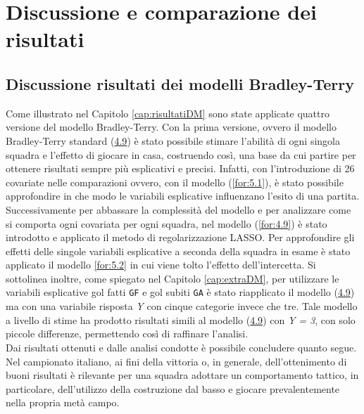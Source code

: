 \chapter{Discussione e comparazione dei risultati}
\label{cap:precls}
\section{Discussione risultati dei modelli Bradley-Terry}
Come illustrato nel Capitolo \ref{cap:risultatiDM} sono state applicate quattro versione del modello Bradley-Terry. Con la prima versione, ovvero il modello Bradley-Terry standard \autocite{bradley1952rank} (\hyperref[for:3.9]{4.9}) è stato possibile stimare l'abilità di ogni singola squadra e l'effetto di giocare in casa, costruendo così, una base da cui partire per ottenere risultati sempre più esplicativi e precisi. Infatti, con l'introduzione di 26 covariate nelle comparazioni ovvero, con il modello (\ref{for:5.1}), è stato possibile approfondire in che modo le variabili esplicative influenzano l'esito di una partita. Successivamente per abbassare la complessità del modello e per analizzare come si comporta ogni covariata per ogni squadra, nel modello (\ref{for:4.9}) è stato introdotto e applicato il metodo di regolarizzazione LASSO. Per approfondire gli effetti delle singole variabili esplicative a seconda della squadra in esame è stato applicato il modello \ref{for:5.2} in cui viene tolto l'effetto dell'intercetta. Si sottolinea inoltre, come spiegato nel Capitolo \ref{cap:extraDM}, per utilizzare le variabili esplicative gol fatti \texttt{GF} e gol subiti \texttt{GA} è stato riapplicato il modello (\hyperref[for:3.9]{4.9}) ma con una variabile risposta \emph{Y} con cinque categorie invece che tre. Tale modello a livello di stime ha prodotto risultati simili al modello (\hyperref[for:3.9]{4.9}) con \emph{Y = 3}, con solo piccole differenze, permettendo così di raffinare l'analisi.\\
Dai risultati ottenuti e dalle analisi condotte è possibile concludere quanto segue. Nel campionato italiano, ai fini della vittoria o, in generale, dell'ottenimento di buoni risultati è rilevante per una squadra adottare un comportamento tattico, in particolare, dell'utilizzo della costruzione dal basso e giocare prevalentemente nella propria metà campo. 
